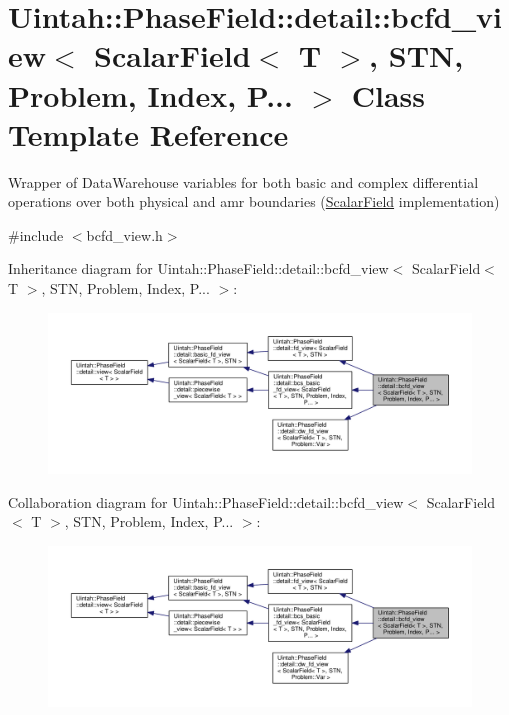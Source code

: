 \hypertarget{classUintah_1_1PhaseField_1_1detail_1_1bcfd__view_3_01ScalarField_3_01T_01_4_00_01STN_00_01Problem_00_01Index_00_01P_8_8_8_01_4}{}\section{Uintah\+:\+:Phase\+Field\+:\+:detail\+:\+:bcfd\+\_\+view$<$ Scalar\+Field$<$ T $>$, S\+TN, Problem, Index, P... $>$ Class Template Reference}
\label{classUintah_1_1PhaseField_1_1detail_1_1bcfd__view_3_01ScalarField_3_01T_01_4_00_01STN_00_01Problem_00_01Index_00_01P_8_8_8_01_4}


Wrapper of Data\+Warehouse variables for both basic and complex differential operations over both physical and amr boundaries (\hyperlink{structUintah_1_1PhaseField_1_1ScalarField}{Scalar\+Field} implementation)  




{\ttfamily \#include $<$bcfd\+\_\+view.\+h$>$}



Inheritance diagram for Uintah\+:\+:Phase\+Field\+:\+:detail\+:\+:bcfd\+\_\+view$<$ Scalar\+Field$<$ T $>$, S\+TN, Problem, Index, P... $>$\+:\nopagebreak
\begin{figure}[H]
\begin{center}
\leavevmode
\includegraphics[width=350pt]{classUintah_1_1PhaseField_1_1detail_1_1bcfd__view_3_01ScalarField_3_01T_01_4_00_01STN_00_01Proble6ebcea295b52797f0a4d54c72847e6a}
\end{center}
\end{figure}


Collaboration diagram for Uintah\+:\+:Phase\+Field\+:\+:detail\+:\+:bcfd\+\_\+view$<$ Scalar\+Field$<$ T $>$, S\+TN, Problem, Index, P... $>$\+:\nopagebreak
\begin{figure}[H]
\begin{center}
\leavevmode
\includegraphics[width=350pt]{classUintah_1_1PhaseField_1_1detail_1_1bcfd__view_3_01ScalarField_3_01T_01_4_00_01STN_00_01Probl4701bf69703a0fc8d343205b0320a4dc}
\end{center}
\end{figure}
